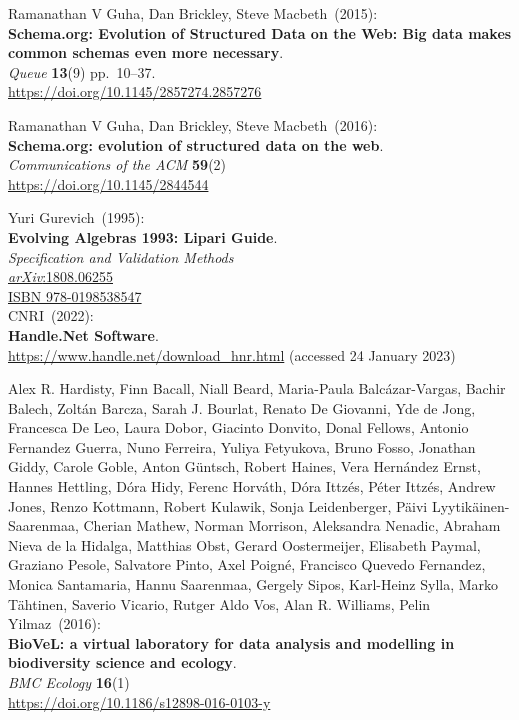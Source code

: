 \begin{thebibliography}{9}
Ramanathan V Guha, Dan Brickley, Steve Macbeth~(2015): \\
\textbf{Schema.org: Evolution of Structured Data on the Web: Big data makes common schemas even more necessary}.\\
\emph{Queue} \textbf{13}(9) pp.~10--37.\\
\url{https://doi.org/10.1145/2857274.2857276}

Ramanathan V Guha, Dan Brickley, Steve Macbeth~(2016): \\
\textbf{Schema.org: evolution of structured data on the web}.\\
\emph{Communications of the ACM} \textbf{59}(2)\\
\url{https://doi.org/10.1145/2844544}

Yuri Gurevich~(1995):\\
\textbf{Evolving Algebras 1993: Lipari Guide}.\\
\emph{Specification and Validation Methods} \\
\href{https://doi.org/10.48550/arXiv.1808.06255}{\emph{arXiv}:1808.06255} \\
\href{https://identifiers.org/isbn/9780198538547}{ISBN 978-0198538547} \\

CNRI~(2022): \\
\textbf{Handle.Net Software}. \\
\url{https://www.handle.net/download_hnr.html} (accessed 24 January 2023)

Alex R. Hardisty, Finn Bacall, Niall Beard, Maria-Paula Balcázar-Vargas, Bachir Balech, Zoltán Barcza, Sarah J. Bourlat, Renato De Giovanni, Yde de Jong, Francesca De Leo, Laura Dobor, Giacinto Donvito, Donal Fellows, Antonio Fernandez Guerra, Nuno Ferreira, Yuliya Fetyukova, Bruno Fosso, Jonathan Giddy, Carole Goble, Anton Güntsch, Robert Haines, Vera Hernández Ernst, Hannes Hettling, Dóra Hidy, Ferenc Horváth, Dóra Ittzés, Péter Ittzés, Andrew Jones, Renzo Kottmann, Robert Kulawik, Sonja Leidenberger, Päivi Lyytikäinen-Saarenmaa, Cherian Mathew, Norman Morrison, Aleksandra Nenadic, Abraham Nieva de la Hidalga, Matthias Obst, Gerard Oostermeijer, Elisabeth Paymal, Graziano Pesole, Salvatore Pinto, Axel Poigné, Francisco Quevedo Fernandez, Monica Santamaria, Hannu Saarenmaa, Gergely Sipos, Karl-Heinz Sylla, Marko Tähtinen, Saverio Vicario, Rutger Aldo Vos, Alan R. Williams, Pelin Yilmaz~(2016): \\
\textbf{BioVeL: a virtual laboratory for data analysis and modelling in biodiversity science and ecology}.\\
\emph{BMC Ecology} \textbf{16}(1)\\
\url{https://doi.org/10.1186/s12898-016-0103-y}


\end{thebibliography}
